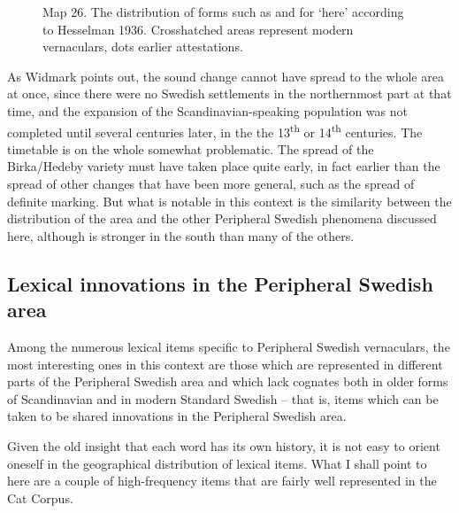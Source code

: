 \begin{figure}[h]
\centering
\begin{minipage}{5.875in}
\label{bkm:Ref176928280}Map 26. The distribution of forms such as  and  for ‘here’ according to Hesselman 1936. Crosshatched areas represent modern vernaculars, dots earlier attestations.
\end{minipage}
\end{figure}
\clearpage%
As Widmark points out, the sound change  cannot have spread to the whole area at once, since there were no Swedish settlements in the northernmost part at that time, and the expansion of the Scandinavian-speaking population was not completed until several centuries later, in the the 13\textsuperscript{th} or 14\textsuperscript{th} centuries. The timetable is on the whole somewhat problematic. The spread of the Birka/Hedeby variety must have taken place quite early, in fact earlier than the spread of other changes that have been more general, such as the spread of definite marking. But what is notable in this context is the similarity between the distribution of the area and the other Peripheral Swedish phenomena discussed here, although  is stronger in the south than many of the others. 


\subsection[Lexical innovations in the Peripheral Swedish area]{\rmfamily Lexical innovations in the Peripheral Swedish area}
Among the numerous lexical items specific to Peripheral Swedish vernaculars, the most interesting ones in this context are those which are represented in different parts of the Peripheral Swedish area and which lack cognates both in older forms of Scandinavian and in modern Standard Swedish – that is, items which can be taken to be shared innovations in the Peripheral Swedish area. 

Given the old insight that each word has its own history, it is not easy to orient oneself in the geographical distribution of lexical items. What I shall point to here are a couple of high-frequency items that are fairly well represented in the Cat Corpus.

